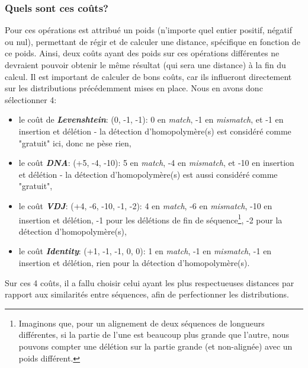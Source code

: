 \documentclass[pdftex,12pt,a4paper]{report}
\begin{document}
\begin{spacing}{1.2}
\subsubsection{Quels sont ces coûts?}

Pour ces opérations est attribué un poids (n'importe quel entier positif, négatif ou nul), permettant de régir et de calculer une distance, spécifique en fonction de ce poids.
\newline
Ainsi, deux coûts ayant des poids sur ces opérations différentes ne devraient pouvoir obtenir le même résultat (qui sera une distance) à la fin du calcul.
\newline
Il est important de calculer de bons coûts, car ils influeront directement sur les distributions précédemment mises en place. Nous en avons donc sélectionner 4:
\begin{itemize}
\item{le coût de \textbf{\textit{Levenshtein}}: (0, -1, -1): 0 en \textit{match}, -1 en \textit{mismatch}, et -1 en insertion et délétion - la détection d'homopolymère(s) est considéré comme "gratuit" ici, donc ne pèse rien,}
\item{le coût \textbf{\textit{DNA}}: (+5, -4, -10): 5 en \textit{match}, -4 en \textit{mismatch}, et -10 en insertion et délétion - la détection d'homopolymère(s) est aussi considéré comme "gratuit",}
\item{le coût \textbf{\textit{VDJ}}: (+4, -6, -10, -1, -2): 4 en \textit{match}, -6 en \textit{mismatch}, -10 en insertion et délétion, -1 pour les délétions de fin de séquence\footnote{Imaginons que, pour un alignement de deux séquences de longueurs différentes, si la partie de l'une est beaucoup plus grande que l'autre, nous pouvons compter une délétion sur la partie grande (et non-alignée) avec un poids différent.}, -2 pour la détection d'homopolymère(s),}
\item{le coût \textbf{\textit{Identity}}: (+1, -1, -1, 0, 0): 1 en \textit{match}, -1 en \textit{mismatch}, -1 en insertion et délétion, rien pour la détection d'homopolymère(s).}
\end{itemize}
Sur ces 4 coûts, il a fallu choisir celui ayant les plus respectueuses distances par rapport aux similarités entre séquences, afin de perfectionner les distributions.


\end{spacing}
\end{document}
